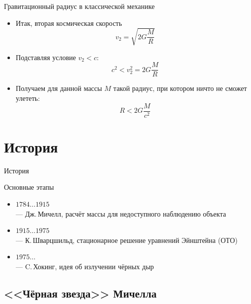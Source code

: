 \documentclass[usenames,dvipsnames,pdftex,unicode,hidelinks]{beamer}
\newcommand{\splashsection}[1]{
    \section{#1}
    \begin{frame}[plain]
      \begin{center}
        \huge #1
      \end{center}
    \end{frame}
  }
\begin{document}
  \begin{frame}{Гравитационный радиус в классической механике}
    \begin{itemize}
      \item<1-> Итак, вторая космическая скорость
        \[
          v_2 = \sqrt{2G\frac{M}{R}}
        \]
      \item<2-> Подставляя условие $v_2 < c$:
        \[
          c^2 < v_2^2 = 2G\frac{M}{R}
        \]
      \item<3-> Получаем для данной массы $M$ такой радиус, при котором ничто не сможет улететь:
        \[
          \boxed{
            R < 2G\frac{M}{c^2}
          }
        \]

    \end{itemize}
  \end{frame}

  \splashsection{История}

  \begin{frame}{Основные этапы}
    \begin{itemize}
      \item<1> $1784\dots1915$\\--- Дж.\,Мичелл, расчёт массы для недоступного наблюдению объекта 
      \item<2> $1915\dots1975$\\--- К.\,Шварцшильд, стационарное решение уравнений Эйнштейна (ОТО)
      \item<3> $1975\dots$\\--- C.\,Хокинг, идея об излучении чёрных дыр
    \end{itemize}
  \end{frame}

  \subsection{<<Чёрная звезда>> Мичелла}
    
\end{document}
